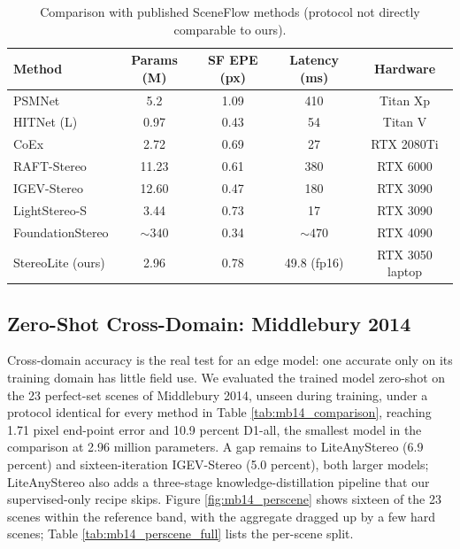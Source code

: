 \enlargethispage{3cm}
\vspace{-0.5cm}
\begin{table}[H]
\centering
\caption{Comparison with published SceneFlow methods (protocol not directly comparable to ours).}
\label{tab:sceneflow_comparison}
\small
\renewcommand{\arraystretch}{0.9}
\begin{tabular}{lcccc}
\toprule
Method & Params (M) & SF EPE (px) & Latency (ms) & Hardware\\
\midrule
PSMNet \cite{chang2018psmnet} & 5.2 & 1.09 & 410 & Titan Xp\\
HITNet (L) \cite{tankovich2021hitnet} & 0.97 & 0.43 & 54 & Titan V\\
CoEx \cite{bangunharcana2021coex} & 2.72 & 0.69 & 27 & RTX 2080Ti\\
RAFT-Stereo \cite{lipson2021raftstereo} & 11.23 & 0.61 & 380 & RTX 6000\\
IGEV-Stereo \cite{xu2023igev} & 12.60 & 0.47 & 180 & RTX 3090\\
LightStereo-S \cite{guo2025lightstereo} & 3.44 & 0.73 & 17 & RTX 3090\\
FoundationStereo \cite{wen2025foundationstereo} & ${\sim}340$ & 0.34 & ${\sim}470$ & RTX 4090\\
\midrule
StereoLite (ours) & 2.96 & 0.78 & 49.8 (fp16) & RTX 3050 laptop\\
\bottomrule
\end{tabular}
\end{table}

\FloatBarrier
\newpage
\subsection{Zero-Shot Cross-Domain: Middlebury 2014}
Cross-domain accuracy is the real test for an edge model: one accurate
only on its training domain has little field use. We evaluated the
trained model zero-shot on the 23 perfect-set scenes of Middlebury
2014, unseen during training, under a protocol identical for every
method in Table \ref{tab:mb14_comparison}, reaching 1.71 pixel
end-point error and 10.9 percent D1-all, the smallest model in the
comparison at 2.96 million parameters. A gap remains to LiteAnyStereo
(6.9 percent) and sixteen-iteration IGEV-Stereo (5.0 percent), both
larger models; LiteAnyStereo also adds a three-stage
knowledge-distillation pipeline that our supervised-only recipe
skips. Figure \ref{fig:mb14_perscene} shows sixteen of the 23 scenes
within the reference band, with the aggregate dragged up by a few hard
scenes; Table \ref{tab:mb14_perscene_full} lists the per-scene split.

